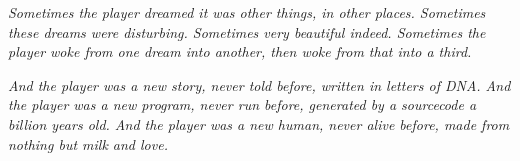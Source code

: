 \bigskip
\textit{Sometimes the player dreamed it was other things, in other places. Sometimes these dreams were disturbing. Sometimes very beautiful indeed. Sometimes the player woke from one dream into another, then woke from that into a third.}
\bigskip

\begin{center}\end{center} %

\bigskip
\textit{And the player was a new story, never told before, written in letters of DNA. And the player was a new program, never run before, generated by a sourcecode a billion years old. And the player was a new human, never alive before, made from nothing but milk and love.}
\bigskip

